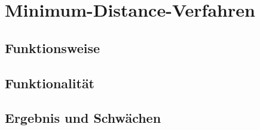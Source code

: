 \chapter{Minimum-Distance-Verfahren}
\section{Funktionsweise}
\section{Funktionalität}
\section{Ergebnis und Schwächen}
